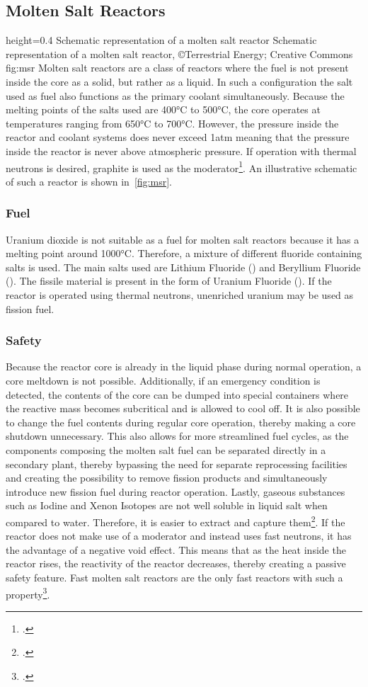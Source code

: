 \subsection{Molten Salt Reactors}
    {height=0.4\textheight}
    {Schematic representation of a molten salt reactor}
    {Schematic representation of a molten salt reactor, ©Terrestrial Energy; Creative Commons}
    {fig:msr}
Molten salt reactors are a class of reactors where the fuel is not present inside the core as a solid,
but rather as a liquid. In such a configuration the salt used as fuel also functions as the primary coolant
simultaneously. Because the melting points of the salts used are 400°C to 500°C, the core operates at temperatures
ranging from 650°C to 700°C. However, the pressure inside the reactor and coolant systems does never
exceed 1atm meaning that the pressure inside the reactor is never above atmospheric pressure.
If operation with thermal neutrons is desired, graphite is used as the moderator\footcite[147-152]{T4Gen}.
An illustrative schematic of such a reactor is shown in~\ref{fig:msr}.
\subsubsection{Fuel}
Uranium dioxide is not suitable as a fuel for molten salt reactors because it has a melting point around
1000°C. Therefore, a mixture of different fluoride containing salts is used. The main salts used are
Lithium Fluoride () and Beryllium Fluoride (). The fissile material is present in the
form of Uranium Fluoride (). If the reactor is operated using thermal neutrons, unenriched
uranium may be used as fission fuel.
\subsubsection{Safety}
Because the reactor core is already in the liquid phase during normal operation, a core meltdown is not
possible. Additionally, if an emergency condition is detected, the contents of the core can be dumped
into special containers where the reactive mass becomes subcritical and is allowed to cool off.
It is also possible to change the fuel contents during regular core operation, thereby making a core
shutdown unnecessary. This also allows for more streamlined fuel cycles, as the components composing
the molten salt fuel can be separated directly in a secondary plant, thereby bypassing the need for
separate reprocessing facilities and creating the possibility to remove fission products and simultaneously
introduce new fission fuel during reactor operation. Lastly, gaseous substances such as Iodine
and Xenon Isotopes are not well soluble in liquid salt when compared to water. Therefore,
it is easier to extract and capture them\footcite{msrs}. If the reactor does not make use
of a moderator and instead uses fast neutrons, it has the advantage of a negative void effect. This
means that as the heat inside the reactor rises, the reactivity of the reactor decreases, thereby
creating a passive safety feature. Fast molten salt reactors are the only fast reactors with such a
property\footcite[164]{T4Gen}.
